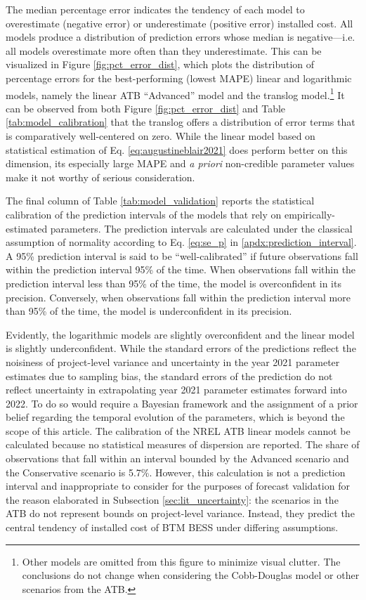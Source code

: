 \documentclass[preprint,12pt,authoryear]{elsarticle}
\begin{document}
The median percentage error indicates the tendency of each model to overestimate (negative error) or underestimate (positive error) installed cost. All models produce a distribution of prediction errors whose median is negative---i.e. all models overestimate more often than they underestimate. This can be visualized in Figure \ref{fig:pct_error_dist}, which plots the distribution of percentage errors for the best-performing (lowest MAPE) linear and logarithmic models, namely the linear ATB ``Advanced'' model and the translog model.\footnote{Other models are omitted from this figure to minimize visual clutter. The conclusions do not change when considering the Cobb-Douglas model or other scenarios from the ATB.} It can be observed from both Figure \ref{fig:pct_error_dist} and Table \ref{tab:model_calibration} that the translog offers a distribution of error terms that is comparatively well-centered on zero. While the linear model based on statistical estimation of Eq. \ref{eq:augustineblair2021} does perform better on this dimension, its especially large MAPE and \textit{a priori} non-credible parameter values make it not worthy of serious consideration.

The final column of Table \ref{tab:model_validation} reports the statistical calibration of the prediction intervals of the models that rely on empirically-estimated parameters. The prediction intervals are calculated under the classical assumption of normality according to Eq. \ref{eq:se_p} in \ref{apdx:prediction_interval}. A 95\% prediction interval is said to be ``well-calibrated'' if future observations fall within the prediction interval 95\% of the time. When observations fall within the prediction interval less than 95\% of the time, the model is overconfident in its precision. Conversely, when observations fall within the prediction interval more than 95\% of the time, the model is underconfident in its precision.

Evidently, the logarithmic models are slightly overconfident and the linear model is slightly underconfident. While the standard errors of the predictions reflect the noisiness of project-level variance and uncertainty in the year 2021 parameter estimates due to sampling bias, the standard errors of the prediction do not reflect uncertainty in extrapolating year 2021 parameter estimates forward into 2022. To do so would require a Bayesian framework and the assignment of a prior belief regarding the temporal evolution of the parameters, which is beyond the scope of this article. The calibration of the NREL ATB linear models cannot be calculated because no statistical measures of dispersion are reported. The share of observations that fall within an interval bounded by the Advanced scenario and the Conservative scenario is 5.7\%. However, this calculation is not a prediction interval and inappropriate to consider for the purposes of forecast validation for the reason elaborated in Subsection \ref{sec:lit_uncertainty}: the scenarios in the ATB do not represent bounds on project-level variance. Instead, they predict the central tendency of installed cost of BTM BESS under differing assumptions. 
\end{document}

